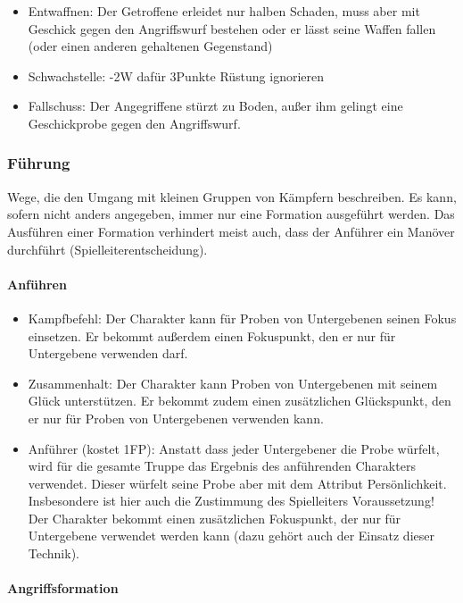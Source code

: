 \documentclass{article}
\begin{document}
\begin{itemize}
\item Entwaffnen: Der Getroffene erleidet nur halben Schaden, muss aber mit Geschick gegen den Angriffswurf bestehen oder er lässt seine Waffen fallen (oder einen anderen gehaltenen Gegenstand)
\item Schwachstelle: -2W dafür 3Punkte Rüstung ignorieren
\item Fallschuss: Der Angegriffene stürzt zu Boden, außer ihm gelingt eine Geschickprobe gegen den Angriffswurf.
\end{itemize}

\subsubsection{Führung}

Wege, die den Umgang mit kleinen Gruppen von Kämpfern beschreiben. Es kann, sofern nicht anders angegeben, immer nur
eine Formation ausgeführt werden. Das Ausführen einer Formation verhindert meist auch, dass der Anführer ein Manöver
durchführt (Spielleiterentscheidung).

\paragraph{Anführen}

\begin{itemize}
\item Kampfbefehl: Der Charakter kann für Proben von Untergebenen seinen Fokus einsetzen. Er bekommt außerdem einen Fokuspunkt, den er nur für Untergebene verwenden darf.
\item Zusammenhalt: Der Charakter kann Proben von Untergebenen mit seinem Glück unterstützen. Er bekommt zudem einen zusätzlichen Glückspunkt, den er nur für Proben von Untergebenen verwenden kann.
\item Anführer (kostet 1FP): Anstatt dass jeder Untergebener die Probe würfelt, wird für die gesamte Truppe das Ergebnis des anführenden Charakters verwendet. Dieser würfelt seine Probe aber mit dem Attribut Persönlichkeit. Insbesondere ist hier auch die Zustimmung des Spielleiters Voraussetzung! Der Charakter bekommt einen zusätzlichen Fokuspunkt, der nur für Untergebene verwendet werden kann (dazu gehört auch der Einsatz dieser Technik).
\end{itemize}

\paragraph{Angriffsformation}
\end{document}
